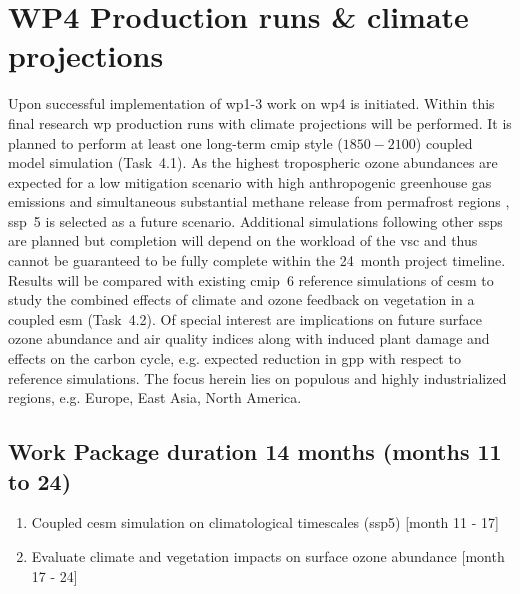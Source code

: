 \section{WP4 Production runs \& climate projections}
\label{sec:wp4}
Upon successful implementation of \gls{wp}1-3 work on \gls{wp}4 is initiated. Within this final research \gls{wp} production runs with climate projections will be performed. It is planned to perform at least one long-term \gls{cmip} style ($1850-2100$) coupled model simulation (Task~4.1). As the highest tropospheric ozone abundances are expected for a low mitigation scenario with high anthropogenic greenhouse gas emissions and simultaneous substantial methane release from permafrost regions \parencites[e.g.][]{JGR:Rieder2015}{AE:Rieder2018}, \gls{ssp}~5 is selected as a future scenario. Additional simulations following other \glspl{ssp} are planned but completion will depend on the workload of the \gls{vsc} and thus cannot be guaranteed to be fully complete within the 24~month project timeline. Results will be compared with existing \gls{cmip}~6 reference simulations of \gls{cesm} to study the combined effects of climate and ozone feedback on vegetation in a coupled \gls{esm} (Task~4.2). Of special interest are implications on future surface ozone abundance and air quality indices along with induced plant damage and effects on the carbon cycle, e.g. expected reduction in \gls{gpp} with respect to reference simulations. The focus herein lies on populous and highly industrialized regions, e.g. Europe, East Asia, North America.
{
\subsection*{Work Package duration 14 months (months 11 to 24)}
\begin{enumerate}[start=1,label={T4.\arabic*}]
  \itemsep0pt
\item Coupled \gls{cesm} simulation on climatological timescales (\gls{ssp}5) \hfill [month 11 - 17]
\item Evaluate climate and vegetation impacts on surface ozone abundance \hfill [month 17 - 24]
\end{enumerate}
}

